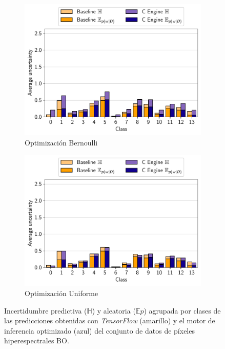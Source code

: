 \begin{figure}[h]
     \centering
     \begin{subfigure}[b]{0.49\textwidth}
         \centering
         \includegraphics[width=\textwidth]{root/Imagenes/opt_software/Bernoulli/HYPER_BO/class_uncertainty.pdf}
         \caption{Optimización Bernoulli}
     \end{subfigure}
     \begin{subfigure}[b]{0.49\textwidth}
         \centering
         \includegraphics[width=\textwidth]{root/Imagenes/opt_software/Uniform/HYPER_BO/class_uncertainty.pdf}
         \caption{Optimización Uniforme}
     \end{subfigure}
    \caption{Incertidumbre predictiva ($\mathbb{H}$) y aleatoria ($\mathbb{E}p$) agrupada por clases de las predicciones obtenidas con \textit{TensorFlow} (amarillo) y el motor de inferencia optimizado (azul) del conjunto de datos de píxeles hiperespectrales BO.}
    \label{fig:comp_bo}
\end{figure}

